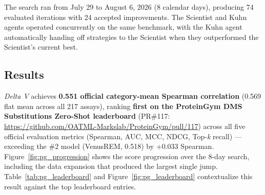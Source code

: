 \documentclass[11pt,a4paper]{article}
\begin{document}
The search ran from July 29 to August 6, 2026 (8 calendar days), producing 74 evaluated iterations with 24 accepted improvements. The Scientist and Kuhn agents operated concurrently on the same benchmark, with the Kuhn agent automatically handing off strategies to the Scientist when they outperformed the Scientist's current best.

\subsection{Results}

\emph{Delta V} achieves \textbf{0.551 official category-mean Spearman correlation} (0.569 flat mean across all 217 assays), ranking \textbf{first on the ProteinGym DMS Substitutions Zero-Shot leaderboard} (PR\#117: \url{https://github.com/OATML-Markslab/ProteinGym/pull/117}) across all five official evaluation metrics (Spearman, AUC, MCC, NDCG, Top-\emph{k} recall) --- exceeding the \#2 model (VenusREM, 0.518) by +0.033 Spearman. Figure~\ref{fig:pg_progression} shows the score progression over the 8-day search, including the data expansion that produced the largest single jump. Table~\ref{tab:pg_leaderboard} and Figure~\ref{fig:pg_leaderboard} contextualize this result against the top leaderboard entries.
\end{document}
